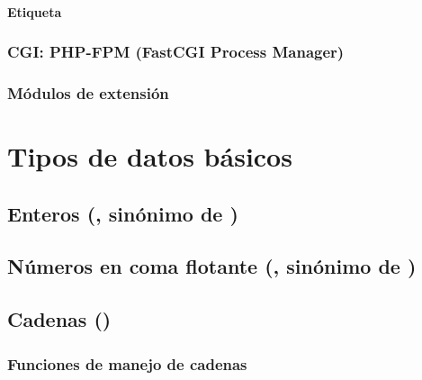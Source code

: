 \documentclass[a4paper,11pt,spanish]{sphinxmanual}
\begin{document}
\subsubsection{Etiqueta }
\label{\detokenize{conceptos-basicos-de-php:etiqueta}}

\subsection{CGI: PHP-FPM (FastCGI Process Manager)}
\label{\detokenize{conceptos-basicos-de-php:cgi-php-fpm-fastcgi-process-manager}}

\subsection{Módulos de extensión}
\label{\detokenize{conceptos-basicos-de-php:modulos-de-extension}}

\chapter{Tipos de datos básicos}
\label{\detokenize{conceptos-basicos-de-php:tipos-de-datos-basicos}}

\section{Enteros (, sinónimo de )}
\label{\detokenize{conceptos-basicos-de-php:enteros-int-sinonimo-de-integer}}

\section{Números en coma flotante (, sinónimo de )}
\label{\detokenize{conceptos-basicos-de-php:numeros-en-coma-flotante-float-sinonimo-de-double}}

\section{Cadenas ()}
\label{\detokenize{conceptos-basicos-de-php:cadenas-string}}

\subsection{Funciones de manejo de cadenas}
\label{\detokenize{conceptos-basicos-de-php:funciones-de-manejo-de-cadenas}}
\end{document}
